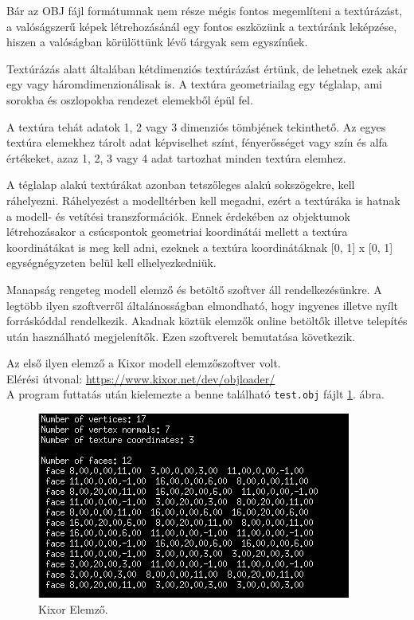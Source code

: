 Bár az OBJ fájl formátumnak nem része mégis fontos megemlíteni a textúrázást, a valóságszerű képek létrehozásánál egy fontos eszközünk a textúránk leképzése, hiszen a valóságban körülöttünk lévő tárgyak sem egyszínűek.

Textúrázás alatt általában kétdimenziós textúrázást értünk, de lehetnek ezek akár egy vagy háromdimenzionálisak is. A textúra geometriailag egy téglalap, ami sorokba és oszlopokba rendezet elemekből épül fel.

A textúra tehát adatok 1, 2 vagy 3 dimenziós tömbjének tekinthető. Az egyes textúra elemekhez tárolt adat képviselhet színt, fényerősséget vagy szín és alfa értékeket, azaz 1, 2, 3 vagy 4 adat  tartozhat minden textúra elemhez.

A téglalap alakú textúrákat azonban tetszőleges alakú sokszögekre, kell ráhelyezni. Ráhelyezést a modelltérben kell megadni, ezért  a textúráka is hatnak a modell- és vetítési transzformációk. Ennek érdekében az objektumok létrehozásakor a csúcspontok geometriai koordinátái mellett a textúra koordinátákat is meg kell adni, ezeknek a textúra koordinátáknak [0, 1] x [0, 1] egységnégyzeten belül kell elhelyezkedniük. \cite{juhasz2003opengl}

Manapság rengeteg modell elemző és betöltő szoftver áll rendelkezésünkre. A legtöbb ilyen szoftverről általánosságban elmondható, hogy ingyenes illetve  nyílt forráskóddal rendelkezik. Akadnak köztük elemzők online betöltők illetve telepítés után használható megjelenítők. Ezen szoftverek bemutatása következik.

Az első ilyen elemző a Kixor modell elemzőszoftver volt.\cite{micah1987markup}\\
Elérési útvonal: \url{https://www.kixor.net/dev/objloader/}\\

A program futtatás után kielemezte a benne található \texttt{test.obj} fájlt \ref{fig:kixor}. ábra.
\bigskip
\begin{figure}[h]
\centering
\includegraphics[scale=0.8]{images/kixor.png}
\caption{Kixor Elemző.}
\label{fig:kixor}
\end{figure}
\bigskip

